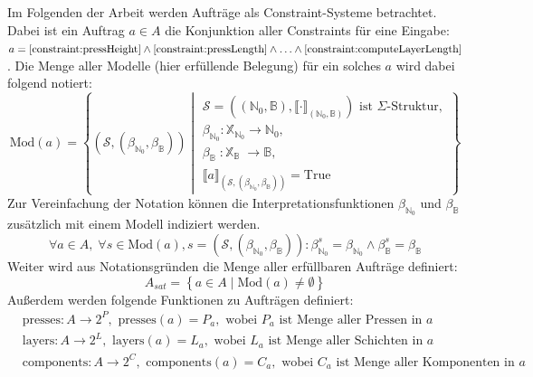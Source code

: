 Im Folgenden der Arbeit werden Aufträge als Constraint-Systeme betrachtet.
Dabei ist ein Auftrag $a \in A$ die Konjunktion aller Constraints für eine Eingabe:
$a = \ref{constraint:pressHeight} \land \ref{constraint:pressLength} \land \ldots \land \ref{constraint:computeLayerLength}$.
Die Menge aller Modelle (hier erfüllende Belegung) für ein solches $a$ wird dabei folgend notiert:
\[
    \text{Mod}(a) = \left\{
        (\mathcal{S}, (\beta_{\mathbb{N}_0}, \beta_{\mathbb{B}})) \middle|
            \begin{array}{l}
                \mathcal{S} = ((\mathbb{N}_0, \mathbb{B}), \llbracket \cdot \rrbracket_{(\mathbb{N}_0, \mathbb{B})}) \text{ ist } \Sigma\text{-Struktur}, \\
                \beta_{\mathbb{N}_0}: \mathbb{X}_{\mathbb{N}_0} \rightarrow \mathbb{N}_0, \\
                \beta_{\mathbb{B}_{\phantom{0}}}: \mathbb{X}_{\mathbb{B}_{\phantom{0}}} \rightarrow \mathbb{B}, \\
                \llbracket a \rrbracket_{(\mathcal{S}, (\beta_{\mathbb{N}_0}, \beta_{\mathbb{B}}))} = \text{True}
            \end{array}
    \right\}
\]
Zur Vereinfachung der Notation können die Interpretationsfunktionen $\beta_{\mathbb{N}_0}$ und $\beta_{\mathbb{B}}$ zusätzlich mit einem Modell indiziert werden.
\[
    \forall a \in A, \; \forall s \in \text{Mod}(a), s = (\mathcal{S}, (\beta_{\mathbb{N}_0}, \beta_{\mathbb{B}})): \beta_{\mathbb{N}_0}^s = \beta_{\mathbb{N}_0} \land \beta_{\mathbb{B}}^s = \beta_{\mathbb{B}}
\]
Weiter wird aus Notationsgründen die Menge aller erfüllbaren Aufträge definiert:
\[
    A_{sat} = \left\{ a \in A \mid \text{Mod}(a) \neq \emptyset \right\}
\]
Außerdem werden folgende Funktionen zu Aufträgen definiert:
\begin{align*}
    & \text{presses}: A \rightarrow 2^P, \text{ presses}(a) = P_a, \text{ wobei } P_a \text{ ist Menge aller Pressen in } a \\
    & \text{layers}: A \rightarrow 2^L, \text{ layers}(a) = L_a, \text{ wobei } L_a \text{ ist Menge aller Schichten in } a \\
    & \text{components}: A \rightarrow 2^C, \text{ components}(a) = C_a, \text{ wobei } C_a \text{ ist Menge aller Komponenten in } a \\
\end{align*}

